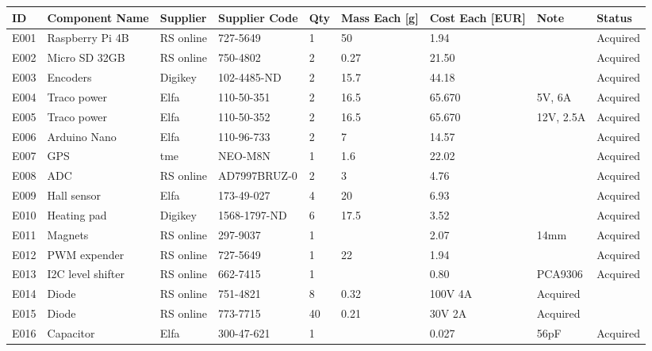 

\begin{longtable}{|m{}|m{}|m{}|m{}|m{}|m{}|m{}|m{}|m{}|}

\hline
\textbf{ID} & \textbf{Component Name} & \textbf{Supplier} & \textbf{Supplier Code} & \textbf{Qty} & \textbf{Mass Each [g]} & \textbf{Cost Each [EUR]} & \textbf{Note} & \textbf{Status} \\ \hline

E001 & Raspberry Pi 4B	& RS online & 727-5649 & 1 & 50 & 1.94 & & Acquired \\\hline
E002 & Micro SD 32GB 	& RS online  & 750-4802 & 2 & 0.27 	& 21.50 & & Acquired  \\\hline
E003 & Encoders				& Digikey & 102-4485-ND & 2 & 15.7 	& 44.18 & & Acquired \\\hline
E004 & Traco power	& Elfa & 110-50-351 & 2 & 16.5  & 65.670 & 5V, 6A & Acquired\\\hline
E005 & Traco power		& Elfa & 110-50-352 & 2 & 16.5  & 65.670 & 12V, 2.5A & Acquired\\\hline
E006 & Arduino Nano	& Elfa & 110-96-733 & 2 & 7	& 14.57 & & Acquired \\\hline
E007 & GPS 		& tme & NEO-M8N & 1 & 1.6 	& 22.02 & & Acquired \\\hline
E008 & ADC		& RS online	&	AD7997BRUZ-0& 2	& 3	&	4.76	&	&Acquired 		\\ \hline
E009 & 	Hall sensor	&	Elfa	&	173-49-027	&	4 &	20	& 6.93		& &	Acquired\\ \hline
E010 & 	Heating pad	&	Digikey	&	1568-1797-ND	&	6 &	17.5	& 3.52		&	&	Acquired	\\ \hline
E011 & 	Magnets	&	RS online	&	297-9037	&	1 &	& 2.07	&	14mm &	Acquired\\ \hline
E012 & 	PWM expender	&	RS online	&	727-5649	&	1 &	22	& 1.94		&	&	Acquired	\\ \hline
E013 & 	I2C level shifter	&	RS online	&	662-7415	&	1 &	& 0.80	&	PCA9306 &	Acquired	\\ \hline
E014 & 	Diode	&	RS online	&	751-4821 	&	8 &	0.32		&	100V 4A&	Acquired	\\ \hline
E015 & 	Diode	&	RS online	&	773-7715 	&	40 &0.21	&	30V 2A&	Acquired	\\ \hline
E016 & 	Capacitor	& Elfa & 300-47-621& 1& & 0.027& 56pF & Acquired	\\ \hline

\end{longtable}
